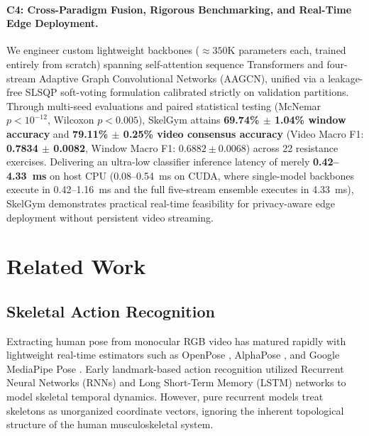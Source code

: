 \documentclass[runningheads]{llncs}
\begin{document}
\paragraph{C4: Cross-Paradigm Fusion, Rigorous Benchmarking, and Real-Time Edge Deployment.} We engineer custom lightweight backbones ($\approx 350\text{K}$ parameters each, trained entirely from scratch) spanning self-attention sequence Transformers and four-stream Adaptive Graph Convolutional Networks (AAGCN), unified via a leakage-free SLSQP soft-voting formulation \cite{kraft1988,virtanen2020} calibrated strictly on validation partitions. Through multi-seed evaluations and paired statistical testing (McNemar $p < 10^{-12}$, Wilcoxon $p < 0.005$), SkelGym attains \textbf{69.74\% $\pm$ 1.04\% window accuracy} and \textbf{79.11\% $\pm$ 0.25\% video consensus accuracy} (Video Macro F1: \textbf{0.7834 $\pm$ 0.0082}, Window Macro F1: $0.6882 \pm 0.0068$) across 22 resistance exercises. Delivering an ultra-low classifier inference latency of merely \textbf{0.42--4.33~ms} on host CPU (0.08--0.54~ms on CUDA, where single-model backbones execute in 0.42--1.16~ms and the full five-stream ensemble executes in 4.33~ms), SkelGym demonstrates practical real-time feasibility for privacy-aware edge deployment without persistent video streaming.

\section{Related Work}

\subsection{Skeletal Action Recognition}
Extracting human pose from monocular RGB video has matured rapidly with lightweight real-time estimators such as OpenPose \cite{cao2019}, AlphaPose \cite{fang2022}, and Google MediaPipe Pose \cite{chuankun2019,bazarevsky2020}. Early landmark-based action recognition utilized Recurrent Neural Networks (RNNs) and Long Short-Term Memory (LSTM) networks \cite{hochreiter1997long,graves2005,li2017} to model skeletal temporal dynamics. However, pure recurrent models treat skeletons as unorganized coordinate vectors, ignoring the inherent topological structure of the human musculoskeletal system.
\end{document}
